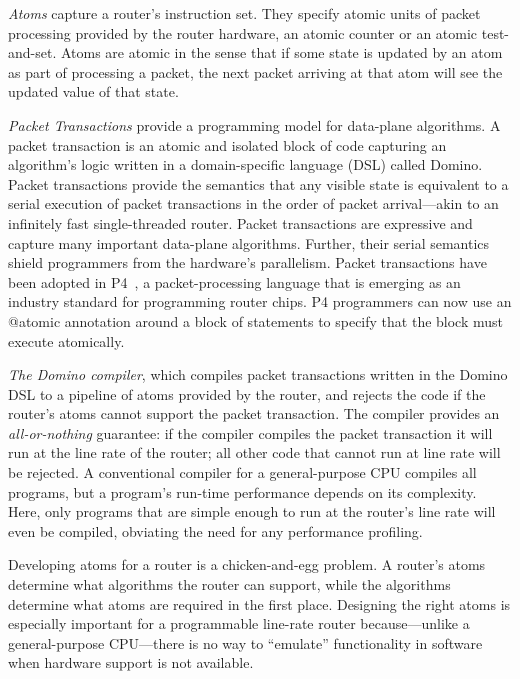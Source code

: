 \begin{CompactEnumerate}
\item \textit{Atoms} capture a router's instruction set. They specify atomic
units of packet processing provided by the router hardware, \eg an atomic
counter or an atomic test-and-set. Atoms are atomic in the sense that if some
state is updated by an atom as part of processing a packet, the next packet
arriving at that atom will see the updated value of that state.
\item \textit{Packet Transactions} provide a programming model for data-plane
algorithms. A packet transaction is an atomic and isolated block of code
capturing an algorithm's logic written in a domain-specific language (DSL)
called Domino. Packet transactions provide the semantics that any visible state
is equivalent to a serial execution of packet transactions in the order of
packet arrival---akin to an infinitely fast single-threaded router. Packet
transactions are expressive and capture many important data-plane algorithms.
Further, their serial semantics shield programmers from the hardware's
parallelism. Packet transactions have been adopted in P4~\cite{p4}, a
packet-processing language that is emerging as an industry standard for
programming router chips.  P4 programmers can now use an @atomic annotation
around a block of statements to specify that the block must execute atomically.

\item \textit{The Domino compiler}, which compiles packet transactions written
in the Domino DSL to a pipeline of atoms provided by the router, and rejects
the code if the router's atoms cannot support the packet transaction. The
compiler provides an {\em all-or-nothing} guarantee: if the compiler compiles
the packet transaction it will run at the line rate of the router; all other
code that cannot run at line rate will be rejected. A conventional compiler for
a general-purpose CPU compiles all programs, but a program's run-time
performance depends on its complexity. Here, only programs that are simple
enough to run at the router's line rate will even be compiled, obviating the
need for any performance profiling.
\end{CompactEnumerate}

Developing atoms for a router is a chicken-and-egg problem. A router's atoms
determine what algorithms the router can support, while the algorithms
determine what atoms are required in the first place. Designing the right atoms
is especially important for a programmable line-rate router because---unlike a
general-purpose CPU---there is no way to ``emulate'' functionality in software
when hardware support is not available.

